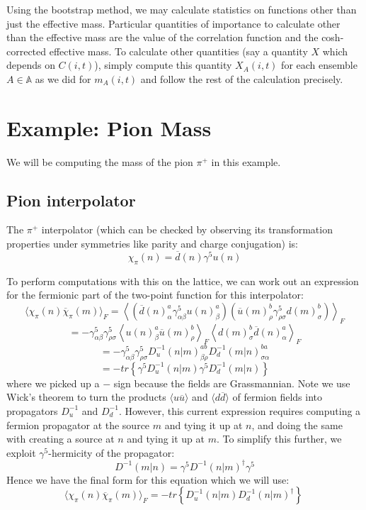 \documentclass[11pt, oneside]{article}   	%
\theoremstyle{definition}
\begin{document}
Using the bootstrap method, we may calculate statistics on functions other than just the effective mass. Particular 
quantities of importance to calculate other than the effective mass are the value of the correlation function and the 
cosh-corrected effective mass. To calculate other quantities (say a quantity $X$ which depends on $C(i, t)$), simply 
compute this quantity $X_A(i, t)$ for each ensemble $A\in\mathbb A$ as we did for $m_A(i, t)$ and follow the rest of 
the calculation precisely. 

\newpage
\section{Example: Pion Mass}

We will be computing the mass of the pion $\pi^+$ in this example.

\subsection{Pion interpolator}

The $\pi^+$ interpolator (which can be checked by observing its transformation properties under symmetries like parity 
and charge conjugation) is:
\begin{equation}
	\chi_\pi(n) = \overline d(n)\gamma^5 u(n)
\end{equation}

To perform computations with this on the lattice, we can work out an expression for the fermionic part of the 
two-point function for this interpolator:
$$
	\langle\chi_\pi(n)\overline\chi_\pi(m)\rangle_F = \left\langle \left(\overline d(n)_\alpha^a \gamma^5_{\alpha\beta} 
	u(n)_\beta^a\right)\left(\overline u(m)_\rho^b\gamma^5_{\rho\sigma} d(m)_\sigma^b\right)\right\rangle_F
$$
$$
	= -\gamma^5_{\alpha\beta}\gamma^5_{\rho\sigma}\left\langle u(n)_\beta^a \overline u(m)_\rho^b\right\rangle_F
	\left\langle d(m)_\sigma^b\overline d(n)_\alpha^a\right\rangle_F
$$
$$
	= -\gamma_{\alpha\beta}^5\gamma_{\rho\sigma}^5 D^{-1}_u(n | m)_{\beta\rho}^{ab} D^{-1}_d (m | n)_{\sigma\alpha}^{ba}
$$
$$
	= -tr\left\{\gamma^5 D^{-1}_u (n | m) \gamma^5 D^{-1}_d (m | n)\right\}
$$
where we picked up a $-$ sign because the fields are Grassmannian. Note we use Wick's 
theorem to turn the products $\langle u \overline u\rangle$ and $\langle d\overline d\rangle$ of fermion fields into propagators 
$D^{-1}_u$ and $D^{-1}_d$. However, this current expression requires computing a fermion propagator at the source $m$ and 
tying it up at $n$, and doing the same with creating a source at $n$ and tying it up at $m$. To simplify this further, we 
exploit $\gamma^5$-hermicity of the propagator:
\begin{equation}
	D^{-1}(m | n) = \gamma^5 D^{-1}(n | m)^\dagger\gamma^5
\end{equation}
Hence we have the final form for this equation which we will use:
\begin{equation}
	\langle\chi_\pi(n)\overline\chi_\pi(m)\rangle_F = - tr\left\{D^{-1}_u (n | m) D^{-1}_d (n | m)^\dagger\right\}~
	\label{eq:correlator}
\end{equation}
\end{document}
